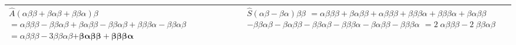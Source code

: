 \documentclass[12pt,a4paper]{article}
\begin{document}
\begin{table}[H]
\begin{tabular}{|p{2cm}|p{7cm}|p{7cm}|}
  \parbox[t][2em]{7cm}{
  $\hat{A}\left( \alpha\beta\beta + \beta\alpha\beta + \beta\beta\alpha \right) \beta$ \\$
= \alpha\beta\beta\beta - \beta\beta\alpha\beta + \beta\alpha\beta\beta - \beta\beta\alpha\beta + \beta\beta\beta\alpha - \beta\beta\alpha\beta$\\
$ = \alpha\beta\beta\beta - 3 \beta\beta\alpha\beta \boldsymbol{+ \beta\alpha\beta\beta + \beta\beta\beta\alpha} $
  }
   & \parbox[t][10em]{7cm}{
   $\hat{S} \left(\alpha\beta - \beta\alpha\right) \beta\beta$\\
   $= \alpha\beta\beta\beta + \beta\alpha\beta\beta + \alpha\beta\beta\beta + \beta\beta\beta\alpha + \beta\beta\beta\alpha + \beta\alpha\beta\beta$\\$
-\beta\beta\alpha\beta - \beta\alpha\beta\beta - \beta\beta\alpha\beta - \beta\beta\beta\alpha - \beta\alpha\beta\beta - \beta\beta\beta\alpha$ \\
$=2 \;\alpha\beta\beta\beta  - 2\; \beta\beta\alpha\beta$
}
  \\ \hline 
\end{tabular}
\end{table}
\end{document}
